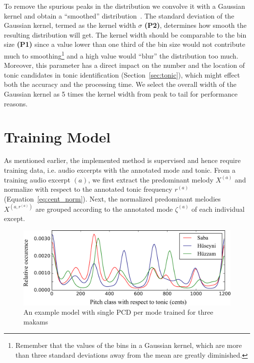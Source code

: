 \documentclass{sig-alternate}
\begin{document}
To remove the spurious peaks in the distribution we convolve it with a Gaussian kernel and obtain a ``smoothed'' distribution~\cite{chordia}. The standard deviation of the Gaussian kernel, termed as the kernel width $\sigma$ {\bf (P2)}, determines how smooth the resulting distribution will get. The kernel width should be comparable to the bin size {\bf (P1)} since a value lower than one third of the bin size would not contribute much to smoothing\footnote{Remember that the values of the bins in a Gaussian kernel, which are more than three standard deviations away from the mean are greatly diminished.} and a high value would ``blur''  the distribution too much. Moreover, this parameter has a direct impact on the number and the location of tonic candidates in tonic identification (Section~\ref{sec:tonic}), which might effect both the accuracy and the processing time. We select the overall width of the Gaussian kernel as 5 times the kernel width from peak to tail for performance reasons.

\section{Training Model}\label{sec:training}
As mentioned earlier, the implemented method is supervised and hence require training data, i.e. audio excerpts with the annotated mode and tonic. From a training audio excerpt $(a)$, we first extract the predominant me\-lody $X^{(a)}$ and normalize with respect to the annotated tonic frequency $r^{(a)}$ (Equation~\ref{eq:cent_norm}). Next, the normalized predominant melo\-dies $X^{\left(a, r^{(a)}\right)}$ are grouped according to the annotated mode $\zeta^{(a)}$ of each individual except. 

\begin{figure}
\centering
\includegraphics[width=.80\columnwidth]{figures/bozkurt_pcd}
\caption{An example model with single PCD per mode trained for three makams}
\label{fig:bozkurt_training}
\end{figure}
\end{document}
